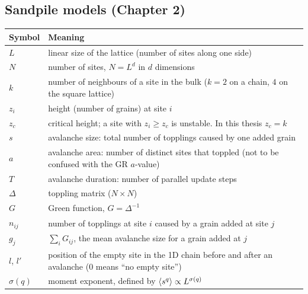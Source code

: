 \subsection*{Sandpile models (Chapter 2)}
\begin{longtable}{@{}p{22mm}p{120mm}@{}}
\toprule
Symbol & Meaning \\
\midrule
$L$ & linear size of the lattice (number of sites along one side) \\
$N$ & number of sites, $N=L^d$ in $d$ dimensions \\
$k$ & number of neighbours of a site in the bulk ($k=2$ on a chain, $4$ on the square lattice) \\
$z_i$ & height (number of grains) at site $i$ \\
$z_c$ & critical height; a site with $z_i\ge z_c$ is unstable. In this thesis $z_c=k$ \\
$s$ & avalanche size: total number of topplings caused by one added grain \\
$a$ & avalanche area: number of distinct sites that toppled (not to be confused with the GR $a$-value) \\
$T$ & avalanche duration: number of parallel update steps \\
$\Delta$ & toppling matrix ($N\times N$) \\
$G$ & Green function, $G=\Delta^{-1}$ \\
$n_{ij}$ & number of topplings at site $i$ caused by a grain added at site $j$ \\
$g_j$ & $\sum_i G_{ij}$, the mean avalanche size for a grain added at $j$ \\
$l$, $l'$ & position of the empty site in the 1D chain before and after an avalanche ($0$ means ``no empty site'') \\
$\sigma(q)$ & moment exponent, defined by $\left\langle s^q \right\rangle\propto L^{\sigma(q)}$ \\
\bottomrule
\end{longtable}

